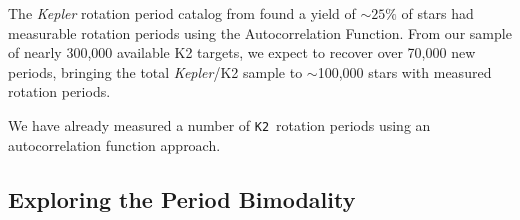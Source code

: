 \documentclass[12pt]{article}
\newcommand{\Kepler}{\textsl{Kepler}\xspace}
\newcommand{\ktwo}{{\tt K2}}
\begin{document}
The \Kepler rotation period catalog from \citet{mcquillan2014} found a yield
of $\sim25\%$ of stars had measurable rotation periods using the
Autocorrelation Function. From our sample of nearly 300,000 available K2 targets, we
expect to recover over 70,000 new periods, bringing the total
\Kepler/K2 sample to $\sim$100,000 stars with measured rotation periods.

We have already measured a number of \ktwo\ rotation periods using an
autocorrelation function approach.






\subsection{Exploring the Period Bimodality}
\end{document}
